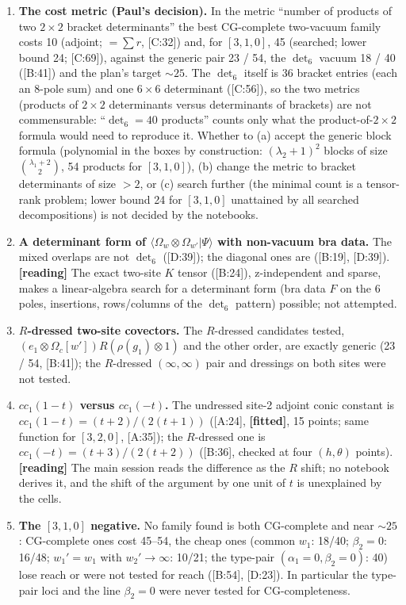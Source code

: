 \documentclass[10pt]{article}
\newcommand{\cl}[2]{\textsf{[#1:#2]}}
\newcommand{\tg}[1]{\textbf{[#1]}}
\newcommand{\Om}{\Omega}
\begin{document}
\begin{enumerate}\setlength{\itemsep}{2pt}
\item \textbf{The cost metric (Paul's decision).} In the metric ``number of products of two $2\times2$ bracket determinants'' the best CG-complete two-vacuum family costs 10 (adjoint; $=\sum r$, \cl{C}{32}) and, for $[3,1,0]$, 45 (searched; lower bound 24; \cl{C}{69}), against the generic pair 23 / 54, the $\det_6$ vacuum 18 / 40 (\cl{B}{41}) and the plan's target $\sim25$. The $\det_6$ itself is 36 bracket entries (each an 8-pole sum) and one $6\times6$ determinant (\cl{C}{56}), so the two metrics (products of $2\times2$ determinants versus determinants of brackets) are not commensurable: ``$\det_6=40$ products'' counts only what the product-of-$2\times2$ formula would need to reproduce it. Whether to (a) accept the generic block formula (polynomial in the boxes by construction: $(\lambda_2+1)^2$ blocks of size $\binom{\lambda_1+2}{2}$, 54 products for $[3,1,0]$), (b) change the metric to bracket determinants of size $>2$, or (c) search further (the minimal count is a tensor-rank problem; lower bound 24 for $[3,1,0]$ unattained by all searched decompositions) is not decided by the notebooks.
\item \textbf{A determinant form of $\langle\Om_w\otimes\Om_{w'}|\Psi\rangle$ with non-vacuum bra data.} The mixed overlaps are not $\det_6$ (\cl{D}{39}); the diagonal ones are (\cl{B}{19}, \cl{D}{39}). \tg{reading} The exact two-site $K$ tensor (\cl{B}{24}), z-independent and sparse, makes a linear-algebra search for a determinant form (bra data $F$ on the 6 poles, insertions, rows/columns of the $\det_6$ pattern) possible; not attempted.
\item \textbf{$R$-dressed two-site covectors.} The $R$-dressed candidates tested, $(e_1\otimes\Om_c[w'])R(\rho(g_1)\otimes1)$ and the other order, are exactly generic (23 / 54, \cl{B}{41}); the $R$-dressed $(\infty,\infty)$ pair and dressings on both sites were not tested.
\item \textbf{$cc_1(1-t)$ versus $cc_1(-t)$.} The undressed site-2 adjoint conic constant is $cc_1(1-t)=(t+2)/(2(t+1))$ (\cl{A}{24}, \tg{fitted}, 15 points; same function for $[3,2,0]$, \cl{A}{35}); the $R$-dressed one is $cc_1(-t)=(t+3)/(2(t+2))$ (\cl{B}{36}, checked at four $(h,\theta)$ points). \tg{reading} The main session reads the difference as the $R$ shift; no notebook derives it, and the shift of the argument by one unit of $t$ is unexplained by the cells.
\item \textbf{The $[3,1,0]$ negative.} No family found is both CG-complete and near $\sim25$: CG-complete ones cost 45--54, the cheap ones (common $w_1$: 18/40; $\beta_2=0$: 16/48; $w_1'=w_1$ with $w_2'\to\infty$: 10/21; the type-pair $(\alpha_1=0,\beta_2=0)$: 40) lose reach or were not tested for reach (\cl{B}{54}, \cl{D}{23}). In particular the type-pair loci and the line $\beta_2=0$ were never tested for CG-completeness.

\end{enumerate}
\end{document}
